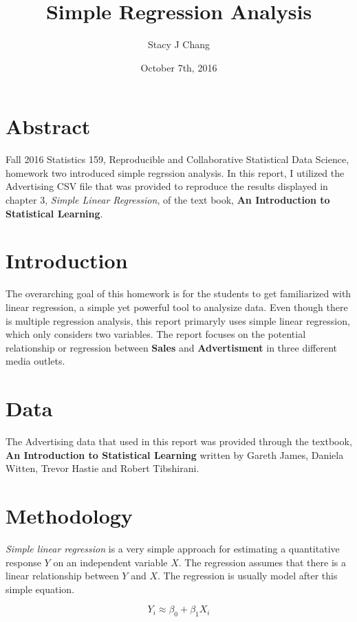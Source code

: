 \documentclass{article}
\title{Simple Regression Analysis}
\author{Stacy J Chang}
\date{October 7th, 2016}
\begin{document}

\maketitle

\section{Abstract}

Fall 2016 Statistics 159, Reproducible and Collaborative Statistical Data Science, homework two introduced simple regrssion analysis. In this report, I utilized the Advertising CSV file that was provided to reproduce the results displayed in chapter 3, \emph{Simple Linear Regression}, of the text book, \textbf{An Introduction to Statistical Learning}. 

\section{Introduction}

The overarching goal of this homework is for the students to get familiarized with linear regression, a simple yet powerful tool to analysize data. Even though there is multiple regression analysis, this report primaryly uses simple linear regression, which only considers two variables. The report focuses on the potential relationship or regression between \textbf{Sales} and \textbf{Advertisment} in three different media outlets. 

\section{Data}

The Advertising data that used in this report was provided through the textbook, \textbf{An Introduction to Statistical Learning} written by Gareth James, Daniela Witten, Trevor Hastie and Robert Tibshirani. 

\section{Methodology}

\emph{Simple linear regression} is a very simple approach for estimating a quantitative response $Y$ on an independent variable $X$. The regression assumes that there is a linear relationship between $Y$ and $X$. The regression is usually model after this simple equation.

\begin{equation}
Y_i \approx {\beta}_0 + {\beta}_1 X_i
\end{equation}
\end{document}
